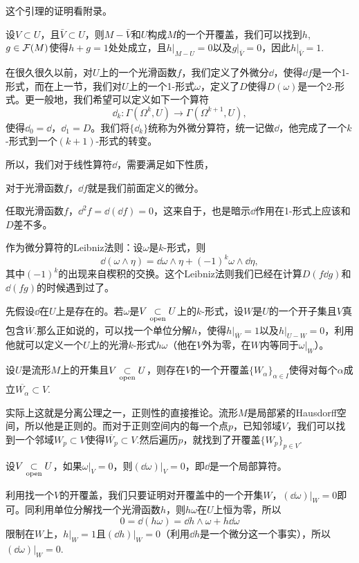 这个引理的证明看附录。

\para \label{unit} 设$V\subset U$，且$\bar{V}\subset U$，则$M-\bar{V}$和$U$构成$M$的一个开覆盖，我们可以找到$h$, $g\in \mathcal{F}(M)$使得$h+g=1$处处成立，且$h|_{M-U}=0$以及$g|_{\bar{V}}=0$，因此$h|_{\bar{V}}=1$.

\para 在很久很久以前，对$U$上的一个光滑函数$f$，我们定义了外微分$\dd$，使得$\dd f$是一个1-形式，而在上一节，我们对$U$上的一个1-形式$\omega$，定义了$D$使得$D(\omega)$是一个2-形式。更一般地，我们希望可以定义如下一个算符
\[
	\dd_k:\Gamma(\Omega^k,U)\to \Gamma(\Omega^{k+1},U),
\]
使得$\dd_0=\dd$，$\dd_1=D$。我们将$\{\dd_k\}$统称为外微分算符，统一记做$\dd$，他完成了一个$k$-形式到一个$(k+1)$-形式的转变。

所以，我们对于线性算符$\dd$，需要满足如下性质，

 对于光滑函数$f$，$\dd f$就是我们前面定义的微分。

 任取光滑函数$f$，$\dd^2 f=\dd (\dd f)=0$，这来自于，也是暗示$\dd$作用在1-形式上应该和$D$差不多。

 作为微分算符的Leibniz法则：设$\omega$是$k$-形式，则
\[
	\dd(\omega\wedge \eta)=\dd \omega \wedge \eta +(-1)^k \omega\wedge \dd\eta,
\]
其中$(-1)^k$的出现来自楔积的交换。这个Leibniz法则我们已经在计算$D(f\dd g)$和$\dd(fg)$的时候遇到过了。

\para \label{localform}先假设$\dd$在$U$上是存在的。若$\omega$是$V\underset{\mathrm{open}}{\subset} U$上的$k$-形式，设$W$是$U$的一个开子集且$V$真包含$\overline{W}$.那么正如说的，可以找一个单位分解$h$，使得$h|_{\overline{W}}=1$以及$h|_{U-W}=0$，利用他就可以定义一个$U$上的光滑$k$-形式$h\omega$（他在$V$外为零，在$W$内等同于$\omega|_W$）。

\para \label{regular}设$U$是流形$M$上的开集且$V\underset{\mathrm{open}}{\subset} U$，则存在$V$的一个开覆盖$\{W_\alpha\}_{\alpha\in I}$使得对每个$\alpha$成立$\overline{W_\alpha}\subset V$.

实际上这就是分离公理之一，正则性的直接推论。流形$M$是局部紧的Hausdorff空间，所以他是正则的。而对于正则空间内的每一个点$p$，已知邻域$V$，我们可以找到一个邻域$W_p\subset V$使得$\overline{W_p}\subset V$.然后遍历$p$，就找到了开覆盖$\{W_p\}_{p\in V}$.

\para \label{localpro}设$V\underset{\mathrm{open}}{\subset} U$，如果$\omega|_V=0$，则$(\dd \omega)|_V=0$，即$\dd$是一个局部算符。

利用找一个$V$的开覆盖，我们只要证明对开覆盖中的一个开集$W$，$(\dd \omega)|_{W}=0$即可。同利用单位分解找一个光滑函数$h$，则$h\omega$在$U$上恒为零，所以
\[
	0=\dd (h\omega)=\dd h \wedge \omega +h\dd \omega
\]
限制在$W$上，$h|_{W}=1$且$(\dd h)|_{W}=0$（利用$\dd h$是一个微分这一个事实），所以$(\dd \omega)|_{W}=0$.

